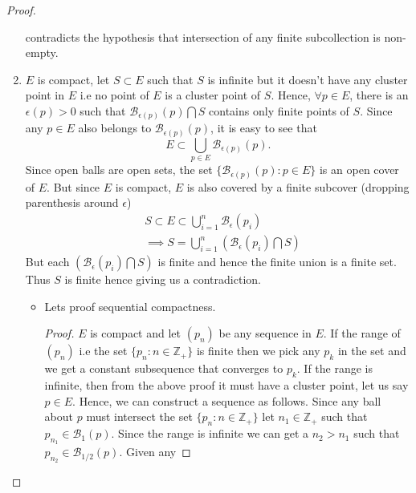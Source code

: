 \begin{proof}
\begin{enumerate}
	   contradicts the hypothesis that intersection of any finite subcollection is non-empty.
       \item $E$ is compact, let $S \subset E$ such that $S$ is infinite but it doesn't have any
	   cluster point in $E$ i.e no point of $E$ is a cluster point of $S$. Hence, $\forall p \in
	   E$, there is an $\epsilon(p) > 0$ such that $\mathcal{B}_{\epsilon(p)}\left(p\right)
	   \bigcap S$ contains only finite points of $S$. Since any $p \in E$ also belongs to 
	   $\mathcal{B}_{\epsilon(p)}\left(p\right)$, it is easy to see that \[ E \subset \bigcup_{p
		   \in E} \mathcal{B}_{\epsilon(p)}\left(p\right) .\] Since open balls are open sets,
	       the set $\left.\lbrace \mathcal{B}_{\epsilon(p)}\left(p\right) : p \in E
		   \rbrace\right.$ is an open cover of $E$. But since $E$ is compact, $E$ is also
	       covered by a finite subcover (dropping parenthesis around $\epsilon$) 
	       \begin{displaymath}
		   \begin{aligned}
		       & S \subset E \subset \bigcup_{i = 1}^n
		       \mathcal{B}_{\epsilon }\left(p_i\right) \\
		       & \implies S = \bigcup_{i = 1}^n \left( \mathcal{B}_{\epsilon}
			   \left(p_i \right) \bigcap S \right)
		   \end{aligned}
	       \end{displaymath} 
	        But each
	       $\left( \mathcal{B}_{\epsilon }\left(p_i \right) \bigcap S \right)$ is finite
	       and hence the finite union is a finite set. Thus $S$ is finite hence giving us a
	       contradiction.
	       \begin{itemize}
		   \item Lets proof sequential compactness. 
		       \begin{proof}
			   $E$ is compact and let $\left(p_n\right)$ be any sequence in $E$. If the
			   range of $\left(p_n\right)$ i.e the set $\left.\lbrace p_n : n \in
			       \mathbb{Z}_+ \rbrace\right.$ is finite then we pick any $p_k$ in the
			   set and we get a constant subsequence that converges to $p_k$. If the
			   range is infinite, then from the above proof it must have a cluster
			   point, let us say $p \in E$. Hence, we can construct a sequence as
			   follows. Since any ball about $p$ must intersect the set $\left.\lbrace 
			       p_n : n \in \mathbb{Z}_+ \rbrace\right.$ let $n_1 \in \mathbb{Z}_+$ such
			   that $p_{n_1} \in \mathcal{B}_1(p)$. Since the range is infinite we can
			   get a $n_2 > n_1$ such that $p_{n_2} \in \mathcal{B}_{1/2}(p)$. Given any

\end{proof}
\end{itemize}
\end{enumerate}
\end{proof}
